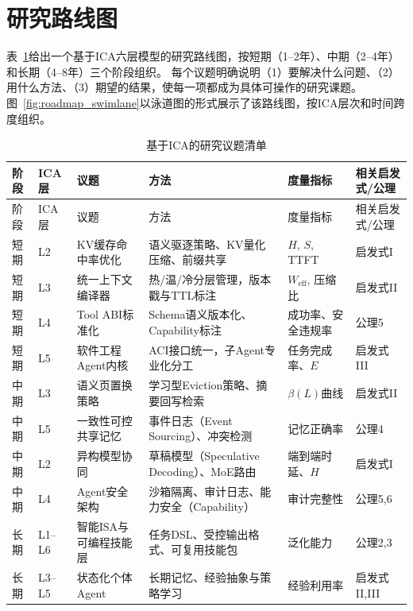 \section{研究路线图}
\label{sec:roadmap}

表~\ref{tab:roadmap}给出一个基于ICA六层模型的研究路线图，按短期（1--2年）、中期（2--4年）和长期（4--8年）三个阶段组织。
每个议题明确说明（1）要解决什么问题、（2）用什么方法、（3）期望的结果，使每一项都成为具体可操作的研究课题。
图~\ref{fig:roadmap_swimlane}以泳道图的形式展示了该路线图，按ICA层次和时间跨度组织。

\footnotesize
\renewcommand{\arraystretch}{1.35}
\begin{longtable}{>{\small}p{}>{\small}p{}>{\small}p{}>{\small}p{}>{\small}p{}>{\small}p{}}
\caption{基于ICA的研究议题清单}
\label{tab:roadmap}\\
\toprule
阶段 & ICA层 & 议题 & 方法 & 度量指标 & 相关启发式/公理 \\
\midrule
\endfirsthead
\toprule
阶段 & ICA层 & 议题 & 方法 & 度量指标 & 相关启发式/公理 \\
\midrule
\endhead
短期 & L2 & KV缓存命中率优化 & 语义驱逐策略、KV量化压缩、前缀共享 & $H$, $S$, TTFT & 启发式I \\[3pt]
短期 & L3 & 统一上下文编译器 & 热/温/冷分层管理，版本戳与TTL标注 & $W_{\mathrm{eff}}$, 压缩比 & 启发式II \\[3pt]
短期 & L4 & Tool ABI标准化 & Schema语义版本化、Capability标注 & 成功率、安全违规率 & 公理5 \\[3pt]
短期 & L5 & 软件工程Agent内核 & ACI接口统一，子Agent专业化分工 & 任务完成率、$E$ & 启发式III \\[3pt]
中期 & L3 & 语义页置换策略 & 学习型Eviction策略、摘要回写检索 & $\beta(L)$曲线 & 启发式II \\[3pt]
中期 & L5 & 一致性可控共享记忆 & 事件日志（Event Sourcing）、冲突检测 & 记忆正确率 & 公理4 \\[3pt]
中期 & L2 & 异构模型协同 & 草稿模型（Speculative Decoding）、MoE路由 & 端到端时延、$H$ & 启发式I \\[3pt]
中期 & L4 & Agent安全架构 & 沙箱隔离、审计日志、能力安全（Capability） & 审计完整性 & 公理5,6 \\[3pt]
长期 & L1--L6 & 智能ISA与可编程技能层 & 任务DSL、受控输出格式、可复用技能包 & 泛化能力 & 公理2,3 \\[3pt]
长期 & L3--L5 & 状态化个体Agent & 长期记忆、经验抽象与策略学习 & 经验利用率 & 启发式II,III \\[3pt]

\end{longtable}
